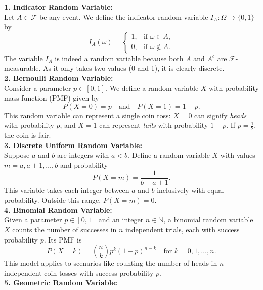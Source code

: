 \textbf{1. Indicator Random Variable:}\\

Let \( A \in \mathcal{F} \) be any event. We define the indicator random variable \( I_A : \Omega \to \{0,1\} \) by
\[
I_A(\omega) = 
\begin{cases} 
1, & \text{if } \omega \in A, \\
0, & \text{if } \omega \notin A.
\end{cases}
\]
The variable \( I_A \) is indeed a random variable because both \( A \) and \( A^c \) are \(\mathcal{F}\)-measurable. As it only takes two values (0 and 1), it is clearly discrete.\\

\textbf{2. Bernoulli Random Variable:} \\

Consider a parameter \( p \in [0, 1] \). We define a random variable \( X \) with probability mass function (PMF) given by
\[
P(X = 0) = p \quad \text{and} \quad P(X = 1) = 1 - p.
\]
This random variable can represent a single coin toss: \( X = 0 \) can signify \textit{heads} with probability \( p \), and \( X = 1 \) can represent \textit{tails} with probability \( 1 - p \). If \( p = \frac{1}{2} \), the coin is fair.\\


\textbf{3. Discrete Uniform Random Variable:}  \\

Suppose \( a \) and \( b \) are integers with \( a < b \). Define a random variable \( X \) with values \( m = a, a+1, \dots, b \) and probability
\[
P(X = m) = \frac{1}{b - a + 1}.
\]
This variable takes each integer between \( a \) and \( b \) inclusively with equal probability. Outside this range, \( P(X = m) = 0 \).\\

\textbf{4. Binomial Random Variable:} \\

Given a parameter \( p \in [0, 1] \) and an integer \( n \in \mathbb{N} \), a binomial random variable \( X \) counts the number of successes in \( n \) independent trials, each with success probability \( p \). Its PMF is
\[
P(X = k) = \binom{n}{k} p^k (1 - p)^{n - k} \quad \text{for } k = 0, 1, \dots, n.
\]
This model applies to scenarios like counting the number of heads in \( n \) independent coin tosses with success probability \( p \).\\

\textbf{5. Geometric Random Variable:}  \\

